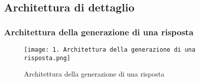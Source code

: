 \newpage

\subsection{Architettura di dettaglio}
\label{sec:architettura_di_dettaglio}

\subsubsection{Architettura della generazione di una risposta}
\label{sec:architettura_generazione_risposta}

\begin{figure}[h]
    \centering
    \texttt{[image: 1. Architettura della generazione di una risposta.png]}
    \caption{Architettura della generazione di una risposta}
\end{figure}

